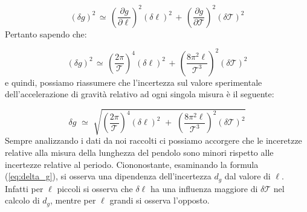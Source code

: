 \begin{equation*}
(\delta g)^2 \, \simeq \, \left( \frac{\partial g}{\partial \ell} \right)^2 (\delta \ell)^2 \, + \, \left( \frac{\partial g}{\partial \mathcal{T}} \right)^2 (\delta \mathcal{T})^2
\end{equation*}
%
Pertanto sapendo che:

\begin{equation*}
(\delta g)^2 \, \simeq \, \left( \frac{2 \pi}{\mathcal{T}} \right)^4 (\delta \ell)^2 \, + \, \left( \frac{8 \pi^2 \ell}{\mathcal{T}^3} \right)^2 (\delta \mathcal{T})^2
\end{equation*}
%
e quindi, possiamo riassumere che l'incertezza sul valore sperimentale dell'accelerazione di gravità relativo ad ogni singola misura è il seguente:

\begin{equation} \label{eq:delta_g}
\delta g \,\, \simeq \,\, \sqrt{\left( \frac{2 \pi}{\mathcal{T}} \right)^4 (\delta \ell)^2 \,\, + \,\, \left( \frac{8 \pi^2 \ell}{\mathcal{T}^3} \right)^2 (\delta \mathcal{T})^2}
\end{equation}
%
Sempre analizzando i dati da noi raccolti ci possiamo accorgere che le inceretzze relative alla misura della lunghezza del pendolo sono minori rispetto alle incertezze relative al periodo. Ciononostante, esaminando la formula (\ref{eq:delta_g}), si osserva una dipendenza dell'incertezza $d_g$ dal valore di $\ell$. Infatti per $\ell$ piccoli si osserva che $\delta \ell$ ha una influenza maggiore di  $\delta \mathcal{T}$ nel calcolo di $d_g$, mentre per  $\ell$ grandi si osserva l'opposto.


